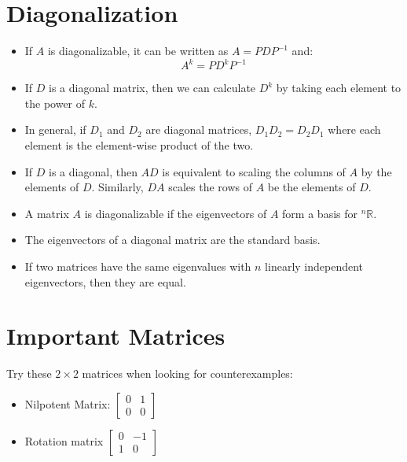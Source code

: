 \documentclass{article}
\begin{document}
    \section{Diagonalization}
    \begin{itemize}
        \item If $A$ is diagonalizable, it can be written as $A=PDP^{-1}$ and:
        \begin{equation}
            A^k = PD^kP^{-1}
        \end{equation}
        \item If $D$ is a diagonal matrix, then we can calculate $D^k$ by taking each element to the power of $k$. 
        \item In general, if $D_1$ and $D_2$ are diagonal matrices, $D_1D_2 = D_2D_1$ where each element is the element-wise product of the two.
        \item If $D$ is a diagonal, then $AD$ is equivalent to scaling the columns of $A$ by the elements of $D$. Similarly, $DA$ scales the rows of $A$ be the elements of $D$.
        \item A matrix $A$ is diagonalizable if the eigenvectors of $A$ form a basis for ${^n}\mathbb{R}$.
        \item The eigenvectors of a diagonal matrix are the standard basis.
        \item If two matrices have the same eigenvalues with $n$ linearly independent eigenvectors, then they are equal.

    \end{itemize}
    \section{Important Matrices}
    Try these $2\times 2$ matrices when looking for counterexamples:
    \begin{itemize}
        \item Nilpotent Matrix: $\begin{bmatrix}
            0&1\\0&0
        \end{bmatrix}$
        \item Rotation matrix $\begin{bmatrix}
            0 & -1 \\ 
            1 & 0
        \end{bmatrix}$
    \end{itemize}
\end{document}
